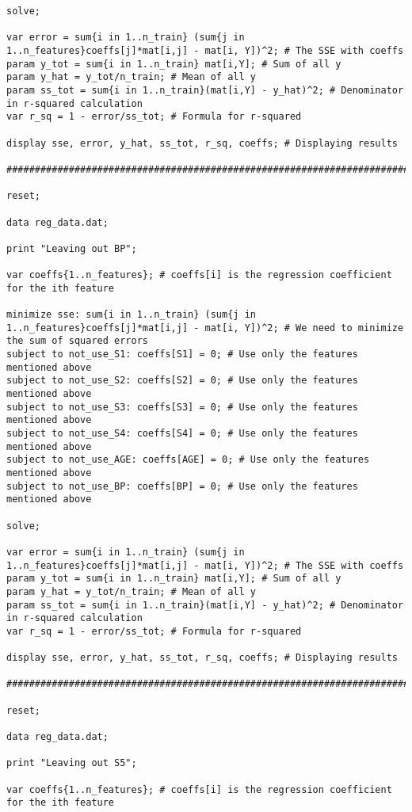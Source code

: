 \documentclass[15pt,a4paper,openright]{article}
\begin{document}
\begin{lstlisting}[language=AMPL, caption=1b Code]
solve;

var error = sum{i in 1..n_train} (sum{j in 1..n_features}coeffs[j]*mat[i,j] - mat[i, Y])^2; # The SSE with coeffs
param y_tot = sum{i in 1..n_train} mat[i,Y]; # Sum of all y
param y_hat = y_tot/n_train; # Mean of all y
param ss_tot = sum{i in 1..n_train}(mat[i,Y] - y_hat)^2; # Denominator in r-squared calculation
var r_sq = 1 - error/ss_tot; # Formula for r-squared

display sse, error, y_hat, ss_tot, r_sq, coeffs; # Displaying results 

#########################################################################

reset;

data reg_data.dat;

print "Leaving out BP";

var coeffs{1..n_features}; # coeffs[i] is the regression coefficient for the ith feature

minimize sse: sum{i in 1..n_train} (sum{j in 1..n_features}coeffs[j]*mat[i,j] - mat[i, Y])^2; # We need to minimize the sum of squared errors
subject to not_use_S1: coeffs[S1] = 0; # Use only the features mentioned above
subject to not_use_S2: coeffs[S2] = 0; # Use only the features mentioned above
subject to not_use_S3: coeffs[S3] = 0; # Use only the features mentioned above
subject to not_use_S4: coeffs[S4] = 0; # Use only the features mentioned above
subject to not_use_AGE: coeffs[AGE] = 0; # Use only the features mentioned above
subject to not_use_BP: coeffs[BP] = 0; # Use only the features mentioned above

solve;

var error = sum{i in 1..n_train} (sum{j in 1..n_features}coeffs[j]*mat[i,j] - mat[i, Y])^2; # The SSE with coeffs
param y_tot = sum{i in 1..n_train} mat[i,Y]; # Sum of all y
param y_hat = y_tot/n_train; # Mean of all y
param ss_tot = sum{i in 1..n_train}(mat[i,Y] - y_hat)^2; # Denominator in r-squared calculation
var r_sq = 1 - error/ss_tot; # Formula for r-squared

display sse, error, y_hat, ss_tot, r_sq, coeffs; # Displaying results

#########################################################################

reset;

data reg_data.dat;

print "Leaving out S5";

var coeffs{1..n_features}; # coeffs[i] is the regression coefficient for the ith feature


\end{lstlisting}
\end{document}
